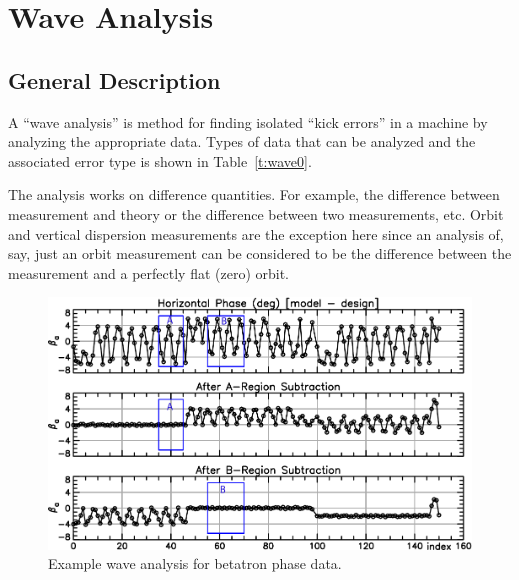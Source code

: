 \chapter{Wave Analysis}
\label{c:wave}

\section{General Description}
\label{s:wave.general}

A ``wave analysis'' is method for finding isolated ``kick errors'' in
a machine by analyzing the appropriate data. Types of data that can be
analyzed and the associated error type is shown in
Table~\ref{t:wave0}.  

The analysis works on difference quantities. For example, the
difference between measurement and theory or the difference between
two measurements, etc. Orbit and vertical dispersion measurements are the
exception here since an analysis of, say, just an orbit measurement can
be considered to be the difference between the measurement and a
perfectly flat (zero) orbit.

\begin{table}[h]
\caption[Wave measurement types.]
{Types of measurements that can be used in a wave analysis and the 
types of errors that can be diagnosed.}
\label{t:wave0}
\end{table}

\begin{figure}[t]
  \centering
  \includegraphics[width=6in]{wave.pdf}
  \caption[Example wave analysis.]
{Example wave analysis for betatron phase data.}
  \label{f:wave}
\end{figure}

